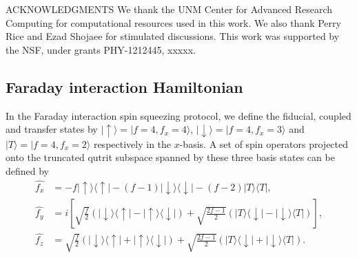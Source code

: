 \documentclass[preprint,aps,pra,onecolumn,superscriptaddress]{revtex4-1} %
\def\bra#1{\langle{#1}\rvert}%
\def\ket#1{\lvert{#1}\rangle}%
\begin{document}
ACKNOWLEDGMENTS
We thank the UNM Center for Advanced Research Computing for computational resources used in this work. We also thank Perry Rice and Ezad Shojaee for stimulated discussions. 
This work was supported by the NSF, under grants PHY-1212445, xxxxx.




\begin{appendix}

\section{Faraday interaction Hamiltonian} \label{Appendix::FaradayInteractionHamiltonian}
In the Faraday interaction spin squeezing protocol, we define the fiducial, coupled and transfer states by $ \ket{\uparrow}=\ket{f=4,f_x=4} $, $ \ket{\downarrow}=\ket{f=4,f_x=3} $ and $ \ket{T}=\ket{f=4,f_x=2} $ respectively in the $ x $-basis. 
A set of spin operators projected onto the truncated qutrit subspace spanned by these three basis states can be defined by
\begin{align}
\hat{f_x} &= -f \ket{\uparrow}\bra{\uparrow} -(f-1)\ket{\downarrow}\bra{\downarrow}-(f-2)\ket{T}\bra{T},\\
\hat{f_y} &=i\left[\sqrt{\frac{f}{2}}\left(\ket{\downarrow}\bra{\uparrow}-\ket{\uparrow}\bra{\downarrow}\right) +\sqrt{\frac{2f-1}{2}}\left(\ket{T}\bra{\downarrow}-\ket{\downarrow}\bra{T} \right) \right] ,\\
\hat{f_z} &= \sqrt{\frac{f}{2}}\left(\ket{\downarrow}\bra{\uparrow}+\ket{\uparrow}\bra{\downarrow}\right) +\sqrt{\frac{2f-1}{2}}\left(\ket{T}\bra{\downarrow}+\ket{\downarrow}\bra{T} \right).
\end{align}


\end{appendix}
\end{document}
